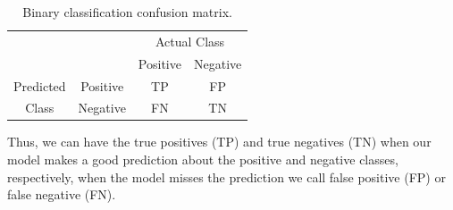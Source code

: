 	\begin{table}[h!]
		\centering
		\caption{Binary classification confusion matrix.}
		\label{tab:conf-matrix}		
		\begin{tabular}{cc|c|c|}
			\cline{3-4}
			&          & \multicolumn{2}{c|}{Actual Class} \\ \cline{3-4} 
			&          & Positive        & Negative        \\ \hline
			\multicolumn{1}{|c|}{Predicted} & Positive & TP              & FP              \\ \cline{2-4} 
			\multicolumn{1}{|c|}{Class}     & Negative & FN              & TN              \\ \hline
		\end{tabular}
	\end{table}

	Thus, we can have the true positives (TP) and true negatives (TN) when our model makes a good prediction about the positive and negative classes, respectively, when the model misses the prediction we call false positive (FP) or false negative (FN). 
	
